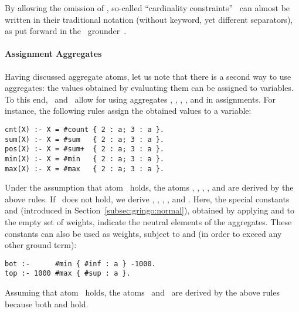 \begin{note}
By allowing the omission of ,
so-called ``cardinality constraints''~\cite{siniso02a}
can almost be written in their traditional notation (without keyword, yet different separators),
as put forward in the \lparse\ grounder~\cite{lparseManual}.
\end{note}

\paragraph{Assignment Aggregates}
Having discussed aggregate atoms,
let us note that there is a second way to use aggregates:
the values obtained by evaluating them can be assigned to variables.
To this end, \gringo\ and \clingo\ allow for using aggregates
, , , , and  in assignments.
%
%
For instance, the following rules assign the obtained values to a variable:
\begin{lstlisting}[numbers=none]
cnt(X) :- X = #count { 2 : a; 3 : a }.
sum(X) :- X = #sum   { 2 : a; 3 : a }.
pos(X) :- X = #sum+  { 2 : a; 3 : a }.
min(X) :- X = #min   { 2 : a; 3 : a }.
max(X) :- X = #max   { 2 : a; 3 : a }.
\end{lstlisting}
Under the assumption that atom~ holds,
the atoms 
,
,
,
, and
 are
derived by the above rules.
If~ does not hold, we derive
,
,
,
, and
.
%
Here, the special constants  and 
(introduced in Section~\ref{subsec:gringo:normal}),
obtained by applying  and  to the empty set of weights,
indicate the neutral elements of the aggregates.
%
These constants can also be used as weights, subject to
 and  (in order to exceed any other ground term):
\begin{lstlisting}[numbers=none]
bot :-      #min { #inf : a } -1000.
top :- 1000 #max { #sup : a }.
\end{lstlisting}
Assuming that atom~ holds,
the atoms~ and~ are derived by the above rules
because both  and  hold.

